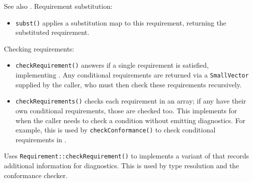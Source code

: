 \documentclass[../generics]{subfiles}
\begin{document}
See also . Requirement substitution:
\begin{itemize}
\item \texttt{subst()} applies a substitution map to this requirement, returning the substituted requirement.
\end{itemize}
Checking requirements:
\begin{itemize}
\item \texttt{checkRequirement()} answers if a single requirement is satisfied, implementing . Any conditional requirements are returned via a \texttt{SmallVector} supplied by the caller, who must then check these requirements recursively.
\item \texttt{checkRequirements()} checks each requirement in an array; if any have their own conditional requirements, those are checked too. This implements  for when the caller needs to check a condition without emitting diagnostics. For example, this is used by \texttt{checkConformance()} to check conditional requirements in .
\end{itemize}

Uses \texttt{Requirement::checkRequirement()} to implements a variant of  that records additional information for diagnostics. This is used by type resolution and the conformance checker.
\end{document}
